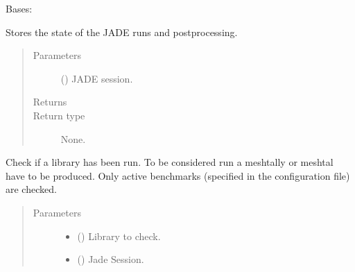 \documentclass[letterpaper,10pt,english]{sphinxmanual}
\begin{document}
\begin{fulllineitems}
\label{\detokenize{api/initobjects:status.Status}}
Bases: 

Stores the state of the JADE runs and post\sphinxhyphen{}processing.
\begin{quote}\begin{description}
\item[{Parameters}] \leavevmode
{} ({\hyperref[\detokenize{api/initobjects:main.Session}]{}}) \textendash{} JADE session.

\item[{Returns}] \leavevmode


\item[{Return type}] \leavevmode
None.

\end{description}\end{quote}

\begin{fulllineitems}
\label{\detokenize{api/initobjects:status.Status.check_lib_run}}
Check if a library has been run. To be considered run a meshtally or
meshtal have to be produced. Only active benchmarks (specified in
the configuration file) are checked.
\begin{quote}\begin{description}
\item[{Parameters}] \leavevmode\begin{itemize}
\item {} 
 () \textendash{} Library to check.

\item {} 
 ({\hyperref[\detokenize{api/initobjects:main.Session}]{}}) \textendash{} Jade Session.


\end{itemize}
\end{description}
\end{quote}
\end{fulllineitems}
\end{fulllineitems}
\end{document}
